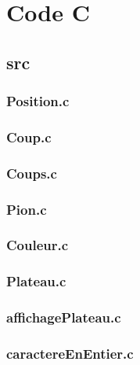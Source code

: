 \section{Code C}

\subsection{src}

\subsubsection{Position.c}

\vline

\subsubsection{Coup.c}

\vline

\subsubsection{Coups.c}

\vline

\subsubsection{Pion.c}

\vline

\subsubsection{Couleur.c}

\vline

\subsubsection{Plateau.c}

\vline

\subsubsection{affichagePlateau.c}

\vline

\subsubsection{caractereEnEntier.c}

\vline

